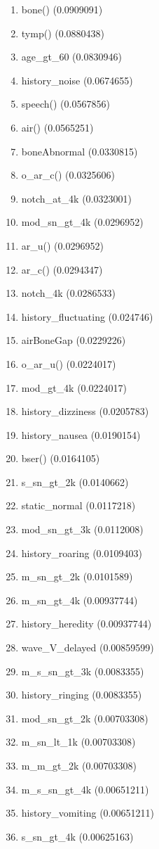\begin{enumerate}
\item bone() (0.0909091)
\item tymp() (0.0880438)
\item age\_gt\_60 (0.0830946)
\item history\_noise (0.0674655)
\item speech() (0.0567856)
\item air() (0.0565251)
\item boneAbnormal (0.0330815)
\item o\_ar\_c() (0.0325606)
\item notch\_at\_4k (0.0323001)
\item mod\_sn\_gt\_4k (0.0296952)
\item ar\_u() (0.0296952)
\item ar\_c() (0.0294347)
\item notch\_4k (0.0286533)
\item history\_fluctuating (0.024746)
\item airBoneGap (0.0229226)
\item o\_ar\_u() (0.0224017)
\item mod\_gt\_4k (0.0224017)
\item history\_dizziness (0.0205783)
\item history\_nausea (0.0190154)
\item bser() (0.0164105)
\item s\_sn\_gt\_2k (0.0140662)
\item static\_normal (0.0117218)
\item mod\_sn\_gt\_3k (0.0112008)
\item history\_roaring (0.0109403)
\item m\_sn\_gt\_2k (0.0101589)
\item m\_sn\_gt\_4k (0.00937744)
\item history\_heredity (0.00937744)
\item wave\_V\_delayed (0.00859599)
\item m\_s\_sn\_gt\_3k (0.0083355)
\item history\_ringing (0.0083355)
\item mod\_sn\_gt\_2k (0.00703308)
\item m\_sn\_lt\_1k (0.00703308)
\item m\_m\_gt\_2k (0.00703308)
\item m\_s\_sn\_gt\_4k (0.00651211)
\item history\_vomiting (0.00651211)
\item s\_sn\_gt\_4k (0.00625163)

\end{enumerate}
